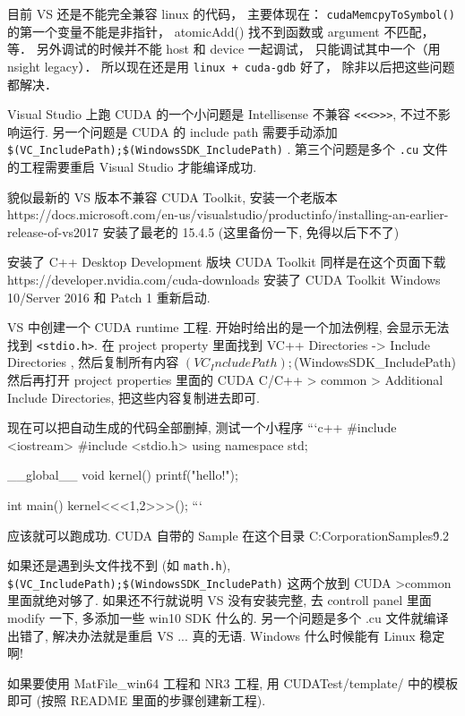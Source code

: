 
目前 VS 还是不能完全兼容 linux 的代码， 主要体现在： \verb|cudaMemcpyToSymbol()| 的第一个变量不能是非指针， atomicAdd() 找不到函数或 argument 不匹配， 等． 另外调试的时候并不能 host 和 device 一起调试， 只能调试其中一个（用 nsight legacy）． 所以现在还是用 \verb|linux + cuda-gdb| 好了， 除非以后把这些问题都解决．


Visual Studio 上跑 CUDA 的一个小问题是 Intellisense 不兼容 \verb`<<<>>>`, 不过不影响运行. 另一个问题是 CUDA 的 include path 需要手动添加 \verb`$(VC_IncludePath);$(WindowsSDK_IncludePath)` . 第三个问题是多个 \verb`.cu` 文件的工程需要重启 Visual Studio 才能编译成功.

貌似最新的 VS 版本不兼容 CUDA Toolkit, 安装一个老版本
https://docs.microsoft.com/en-us/visualstudio/productinfo/installing-an-earlier-release-of-vs2017
安装了最老的 15.4.5 (这里备份一下, 免得以后下不了)

安装了 C++ Desktop Development 版块
CUDA Toolkit 同样是在这个页面下载
https://developer.nvidia.com/cuda-downloads
安装了 CUDA Toolkit Windows 10/Server 2016 和 Patch 1
重新启动.

VS 中创建一个 CUDA runtime 工程. 开始时给出的是一个加法例程, 会显示无法找到 \verb`<stdio.h>`.
在 project property 里面找到 VC++ Directories -> Include Directories , 然后复制所有内容
$(VC_IncludePath);$(WindowsSDK_IncludePath)
然后再打开 project properties 里面的 CUDA C/C++ >  common > Additional Include Directories, 把这些内容复制进去即可.

现在可以把自动生成的代码全部删掉, 测试一个小程序
```c++
#include <iostream>
#include <stdio.h>
using namespace std;

__global__
void kernel()
{
	printf("hello!\n");
}

int main()
{
	kernel<<<1,2>>>();
}
```

应该就可以跑成功.
CUDA 自带的 Sample 在这个目录 C:\ProgramData\NVIDIA Corporation\CUDA Samples\v9.2

如果还是遇到头文件找不到 (如 \verb`math.h`), \verb`$(VC_IncludePath);$(WindowsSDK_IncludePath)` 这两个放到 CUDA >common 里面就绝对够了. 如果还不行就说明 VS 没有安装完整, 去 controll panel 里面 modify 一下, 多添加一些 win10 SDK 什么的.
另一个问题是多个 .cu 文件就编译出错了, 解决办法就是重启 VS ... 真的无语. Windows 什么时候能有 Linux 稳定啊!

如果要使用 MatFile_win64 工程和 NR3 工程, 用 CUDATest/template/ 中的模板即可 (按照 README 里面的步骤创建新工程).
